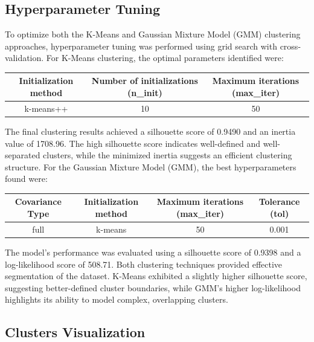     \subsection{Hyperparameter Tuning}
    
    To optimize both the K-Means and Gaussian Mixture Model (GMM) clustering approaches, hyperparameter tuning was performed using grid search with cross-validation. For K-Means clustering, the optimal parameters identified were:
    \begin{table}[h]
        \centering
        \begin{tabular}{|c|c|c|}
            \hline
            \textbf{Initialization method} & \textbf{Number of initializations (n\_init)} & \textbf{Maximum iterations (max\_iter)} \\
            \hline
            k-means++ & 10 & 50 \\
            \hline
        \end{tabular}
    \end{table}

    The final clustering results achieved a silhouette score of 0.9490 and an inertia value of 1708.96. The high silhouette score indicates well-defined and well-separated clusters, while the minimized inertia suggests an efficient clustering structure. For the Gaussian Mixture Model (GMM), the best hyperparameters found were:
        
        \begin{table}[h]
            \centering
            \begin{tabular}{|c|c|c|c|}
                \hline
                \textbf{Covariance Type} & \textbf{Initialization method} & \textbf{Maximum iterations (max\_iter)} & \textbf{Tolerance (tol)} \\
                \hline
                full & k-means & 50 & 0.001 \\
                \hline
            \end{tabular}
        \end{table}

    The model's performance was evaluated using a silhouette score of 0.9398 and a log-likelihood score of 508.71. Both clustering techniques provided effective segmentation of the dataset. K-Means exhibited a slightly higher silhouette score, suggesting better-defined cluster boundaries, while GMM’s higher log-likelihood highlights its ability to model complex, overlapping clusters.
    \subsection{Clusters Visualization}
    
